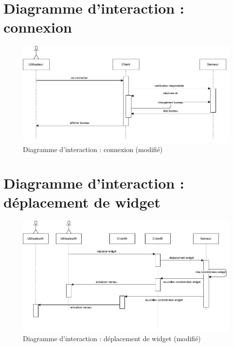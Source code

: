 \section{Diagramme d'interaction : connexion}
\begin{figure}[H]
	\centering
	\includegraphics[angle=90]{diagrammes/DI1.pdf}
	\caption{\color{ForestGreen}Diagramme d'interaction : connexion (modifié)}
\end{figure}

\section{Diagramme d'interaction : déplacement de widget}
\begin{figure}[H]
	\centering
	\includegraphics[angle=90]{diagrammes/DI2.pdf}
	\caption{\color{ForestGreen}Diagramme d'interaction : déplacement de widget (modifié)}
\end{figure}

